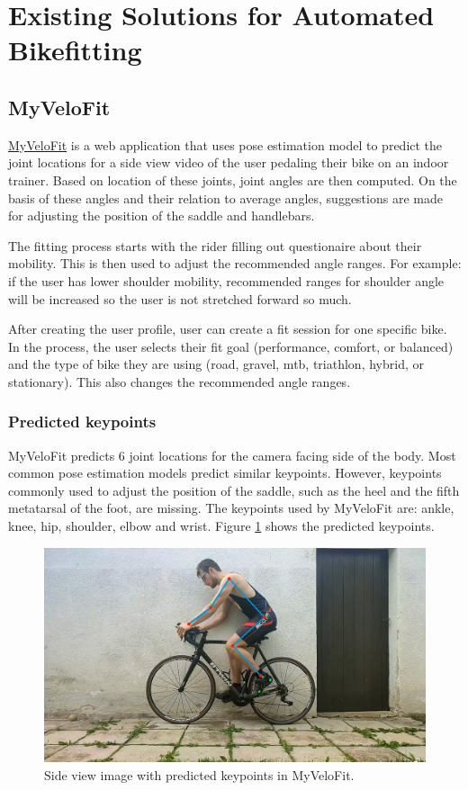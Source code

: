 
\section{Existing Solutions for Automated Bikefitting}

\subsection{MyVeloFit}
\href{https://www.myvelofit.com/}{MyVeloFit}  is a web application that uses pose estimation model to predict the joint locations for a side view video of the user pedaling their bike on an indoor trainer. Based on location of these joints, joint angles are then computed. On the basis of these angles and their relation to average angles, suggestions are made for adjusting the position of the saddle and handlebars.

The fitting process starts with the rider filling out questionaire about their mobility. This is then used to adjust the recommended angle ranges. For example: if the user has lower shoulder mobility, recommended ranges for shoulder angle will be increased so the user is not stretched forward so much.

After creating the user profile, user can create a fit session for one specific bike. In the process, the user selects their fit goal (performance, comfort, or balanced) and the type of bike they are using (road, gravel, mtb, triathlon, hybrid, or stationary). This also changes the recommended angle ranges.

\subsubsection{Predicted keypoints}
MyVeloFit predicts 6 joint locations for the camera facing side of the body. Most common pose estimation models predict similar keypoints. However, keypoints commonly used to adjust the position of the saddle, such as the heel and the fifth metatarsal of the foot, are missing. The keypoints used by MyVeloFit are: ankle, knee, hip, shoulder, elbow and wrist. Figure \ref{fig:myvelofit_keypoints} shows the predicted keypoints.


\begin{figure}[htbp]
    \centering
    \includegraphics[width=\textwidth]{obrazky-figures/myvelofit_keypoints.png}
    \caption{Side view image with predicted keypoints in MyVeloFit.}
    \label{fig:myvelofit_keypoints}
\end{figure}


